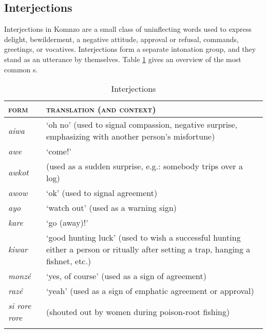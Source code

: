 \subsection{Interjections} \label{interjectionsec}
\vspace{-0.2cm}
Interjections in Komnzo are a small class of uninflecting words used to express delight, bewilderment, a negative attitude, approval or refusal, commands, greetings, or vocatives. Interjections form a separate intonation group, and they stand as an utterance by themselves. Table \ref{interjections} gives an overview of the most common s.
\vspace{-0.2cm}
\begin{table}
\caption{Interjections}
\label{interjections}
	\begin{tabular}{lp{}}
		\lsptoprule
		\textsc{form}&\textsc{translation (and context)}\\\midrule
		\emph{aiwa}&`oh no' (used to signal compassion, negative surprise, emphasizing with another person's misfortune)\\
		\emph{awe}&`come!'\\
		\emph{awkot}& (used as a sudden surprise, e.g.: somebody trips over a log)\\
		\emph{awow}&`ok' (used to signal agreement)\\
		\emph{ayo}&`watch out' (used as a warning sign)\\
		\emph{kare}&`go (away)!'\\
		\emph{kiwar}&`good hunting luck' (used to wish a successful hunting either a person or ritually after setting a trap, hanging a fishnet, etc.)\\
		\emph{monzé}&`yes, of course' (used as a sign of agreement)\\
		\emph{razé}&`yeah' (used as a sign of emphatic agreement or approval)\\
		\emph{si rore rore}& (shouted out by women during poison-root fishing)\\
		\lspbottomrule
	\end{tabular}
\end{table}%